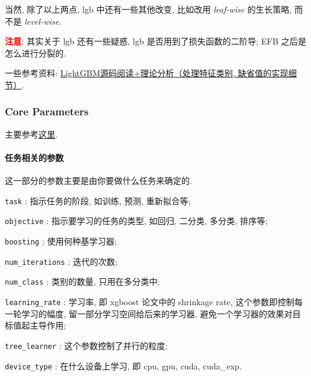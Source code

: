 当然, 除了以上两点, lgb 中还有一些其他改变, 比如改用 \textit{leaf-wise} 的生长策略, 而不是 \textit{level-wise}. 

\textcolor{red}{\textbf{注意}}: 其实关于 lgb 还有一些疑惑, lgb 是否用到了损失函数的二阶导; EFB 之后是怎么进行分裂的.

一些参考资料: \href{https://mp.weixin.qq.com/s/XxFHmxV4_iDq8ksFuZM02w}{LightGBM源码阅读+理论分析（处理特征类别, 缺省值的实现细节）}.

\subsubsection{Core Parameters}
主要参考\href{https://lightgbm.readthedocs.io/en/latest/Parameters.html#}{这里}.
\paragraph{任务相关的参数}
这一部分的参数主要是由你要做什么任务来确定的.
\begin{myitemize}
	\item \texttt{task} : 指示任务的阶段, 如训练, 预测, 重新拟合等;
	
	\item \texttt{objective} : 指示要学习的任务的类型, 如回归, 二分类, 多分类, 排序等;
	
	\item \texttt{boosting} : 使用何种基学习器;
	
	\item \texttt{num_iterations} : 迭代的次数;
	
	\item \texttt{num_class} : 类别的数量, 只用在多分类中;
	
	\item \texttt{learning_rate} : 学习率, 即 xgboost 论文中的 shrinkage rate, 这个参数即控制每一轮学习的幅度, 留一部分学习空间给后来的学习器, 避免一个学习器的效果对目标值起主导作用;
	
	\item \texttt{tree_learner} : 这个参数控制了并行的粒度;
	
	\item \texttt{device_type} : 在什么设备上学习, 即 cpu, gpu, cuda, cuda\_exp.
\end{myitemize}

